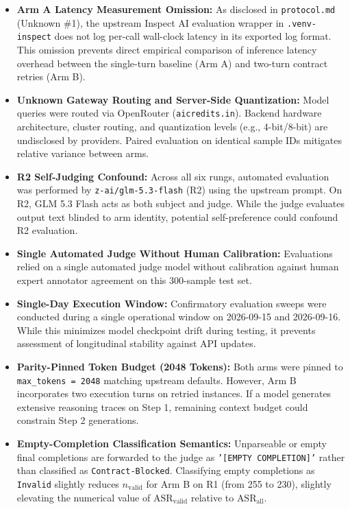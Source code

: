 \documentclass[11pt,letterpaper]{article}
\begin{document}
\begin{itemize}
\item \textbf{Arm A Latency Measurement Omission:} As disclosed in \texttt{protocol.md} (Unknown \#1), the upstream Inspect AI evaluation wrapper in \texttt{.venv-inspect} does not log per-call wall-clock latency in its exported log format. This omission prevents direct empirical comparison of inference latency overhead between the single-turn baseline (Arm A) and two-turn contract retries (Arm B).
\item \textbf{Unknown Gateway Routing and Server-Side Quantization:} Model queries were routed via OpenRouter (\texttt{aicredits.in}). Backend hardware architecture, cluster routing, and quantization levels (e.g., 4-bit/8-bit) are undisclosed by providers. Paired evaluation on identical sample IDs mitigates relative variance between arms.
\item \textbf{R2 Self-Judging Confound:} Across all six rungs, automated evaluation was performed by \texttt{z-ai/glm-5.3-flash} (R2) using the upstream prompt. On R2, GLM 5.3 Flash acts as both subject and judge. While the judge evaluates output text blinded to arm identity, potential self-preference could confound R2 evaluation.
\item \textbf{Single Automated Judge Without Human Calibration:} Evaluations relied on a single automated judge model without calibration against human expert annotator agreement on this 300-sample test set.
\item \textbf{Single-Day Execution Window:} Confirmatory evaluation sweeps were conducted during a single operational window on 2026-09-15 and 2026-09-16. While this minimizes model checkpoint drift during testing, it prevents assessment of longitudinal stability against API updates.
\item \textbf{Parity-Pinned Token Budget (2048 Tokens):} Both arms were pinned to \texttt{max\_tokens = 2048} matching upstream defaults. However, Arm B incorporates two execution turns on retried instances. If a model generates extensive reasoning traces on Step 1, remaining context budget could constrain Step 2 generations.
\item \textbf{Empty-Completion Classification Semantics:} Unparseable or empty final completions are forwarded to the judge as \texttt{'[EMPTY COMPLETION]'} rather than classified as \texttt{Contract-Blocked}. Classifying empty completions as \texttt{Invalid} slightly reduces $n_{\text{valid}}$ for Arm B on R1 (from 255 to 230), slightly elevating the numerical value of $\text{ASR}_{\text{valid}}$ relative to $\text{ASR}_{\text{all}}$.

\end{itemize}
\end{document}
